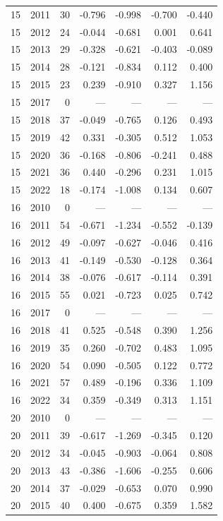 \begin{longtable}{llrrrrr}
15 & 2011 & 30 & -0.796 & -0.998 & -0.700 & -0.440 \\
15 & 2012 & 24 & -0.044 & -0.681 & 0.001 & 0.641 \\
15 & 2013 & 29 & -0.328 & -0.621 & -0.403 & -0.089 \\
15 & 2014 & 28 & -0.121 & -0.834 & 0.112 & 0.400 \\
15 & 2015 & 23 & 0.239 & -0.910 & 0.327 & 1.156 \\
15 & 2017 & 0 & --- & --- & --- & --- \\
15 & 2018 & 37 & -0.049 & -0.765 & 0.126 & 0.493 \\
15 & 2019 & 42 & 0.331 & -0.305 & 0.512 & 1.053 \\
15 & 2020 & 36 & -0.168 & -0.806 & -0.241 & 0.488 \\
15 & 2021 & 36 & 0.440 & -0.296 & 0.231 & 1.015 \\
15 & 2022 & 18 & -0.174 & -1.008 & 0.134 & 0.607 \\
16 & 2010 & 0 & --- & --- & --- & --- \\
16 & 2011 & 54 & -0.671 & -1.234 & -0.552 & -0.139 \\
16 & 2012 & 49 & -0.097 & -0.627 & -0.046 & 0.416 \\
16 & 2013 & 41 & -0.149 & -0.530 & -0.128 & 0.364 \\
16 & 2014 & 38 & -0.076 & -0.617 & -0.114 & 0.391 \\
16 & 2015 & 55 & 0.021 & -0.723 & 0.025 & 0.742 \\
16 & 2017 & 0 & --- & --- & --- & --- \\
16 & 2018 & 41 & 0.525 & -0.548 & 0.390 & 1.256 \\
16 & 2019 & 35 & 0.260 & -0.702 & 0.483 & 1.095 \\
16 & 2020 & 54 & 0.090 & -0.505 & 0.122 & 0.772 \\
16 & 2021 & 57 & 0.489 & -0.196 & 0.336 & 1.109 \\
16 & 2022 & 34 & 0.359 & -0.349 & 0.313 & 1.151 \\
20 & 2010 & 0 & --- & --- & --- & --- \\
20 & 2011 & 39 & -0.617 & -1.269 & -0.345 & 0.120 \\
20 & 2012 & 34 & -0.045 & -0.903 & -0.064 & 0.808 \\
20 & 2013 & 43 & -0.386 & -1.606 & -0.255 & 0.606 \\
20 & 2014 & 37 & -0.029 & -0.653 & 0.070 & 0.990 \\
20 & 2015 & 40 & 0.400 & -0.675 & 0.359 & 1.582 \\

\end{longtable}
